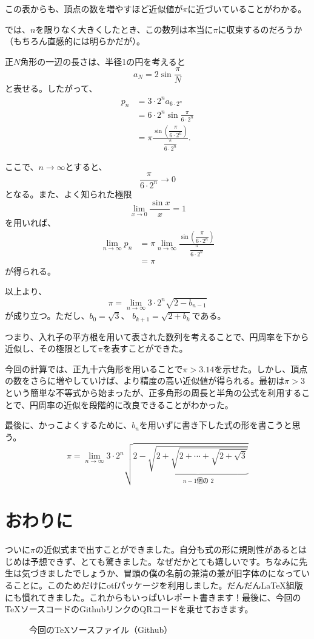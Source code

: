 \documentclass[dvipdfmx]{jlreq}
\begin{document}
この表からも、頂点の数を増やすほど近似値が$\pi$に近づいていることがわかる。

では、$n$を限りなく大きくしたとき、この数列は本当に$\pi$に収束するのだろうか（もちろん直感的には明らかだが）。

正$N$角形の一辺の長さは、半径1の円を考えると
\[
a_N=2\sin\frac{\pi}{N}
\]
と表せる。したがって、
\[
\begin{aligned}
p_n
&=3\cdot 2^n a_{6\cdot 2^n}\\
&=6\cdot 2^n
\sin\frac{\pi}{6\cdot 2^n}\\
&=\pi\frac{
\sin\left(\dfrac{\pi}{6\cdot 2^n}\right)
}{
\dfrac{\pi}{6\cdot 2^n}
}.
\end{aligned}
\]

ここで、$n\to\infty$とすると、
\[
\frac{\pi}{6\cdot 2^n}\to 0
\]
となる。また、よく知られた極限
\[
\lim_{x\to 0}\frac{\sin x}{x}=1
\]
を用いれば、
\[
\begin{aligned}
\lim_{n\to\infty}p_n
&=\pi\lim_{n\to\infty}
\frac{
\sin\left(\dfrac{\pi}{6\cdot 2^n}\right)
}{
\dfrac{\pi}{6\cdot 2^n}
}\\
&=\pi
\end{aligned}
\]
が得られる。

以上より、
\[
\boxed{
\pi=\lim_{n\to\infty}
3\cdot 2^n\sqrt{2-b_{n-1}}
}
\]
が成り立つ。ただし、$b_0=\sqrt{3}$、
$b_{k+1}=\sqrt{2+b_k}$である。

つまり、入れ子の平方根を用いて表された数列を考えることで、円周率を下から近似し、その極限として$\pi$を表すことができた。

今回の計算では、正九十六角形を用いることで$\pi>3.14$を示せた。しかし、頂点の数をさらに増やしていけば、より精度の高い近似値が得られる。最初は$\pi>3$という簡単な不等式から始まったが、正多角形の周長と半角の公式を利用することで、円周率の近似を段階的に改良できることがわかった。

最後に、かっこよくするために、$b_n$を用いずに書き下した式の形を書こうと思う。
\[
\boxed{
\pi=\lim_{n\to\infty}
3\cdot 2^n
\sqrt{
2-\underbrace{
\sqrt{2+\sqrt{2+\cdots+\sqrt{2+\sqrt{3}}}}
}_{n-1\text{個の }2}
}
}
\]
\section{おわりに}
ついに$\pi$の近似式まで出すことができました。自分も式の形に規則性があるとはじめは予想できず、とても驚きました。なぜだかとても嬉しいです。ちなみに先生は気づきましたでしょうか、冒頭の僕の名前の兼清の兼が旧字体のになっていることに。このためだけにotfパッケージを利用しました。だんだんLaTeX組版にも慣れてきました。これからもいっぱいレポート書きます！最後に、今回のTeXソースコードのGithubリンクのQRコードを乗せておきます。
\begin{figure}[htbp]
  \centering
  \vspace{1cm}
  \caption*{今回の\TeX ソースファイル（Github）}
\end{figure}
\end{document}
